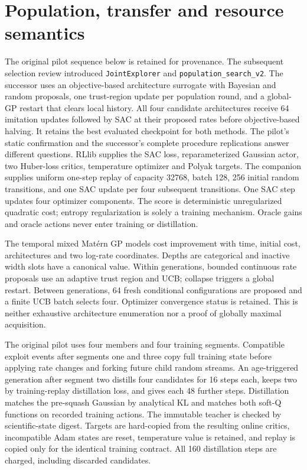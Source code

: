 \section{Population, transfer and resource semantics}
The original pilot sequence below is retained for provenance. The subsequent
selection review introduced \texttt{JointExplorer} and
\texttt{population\_search\_v2}. The successor uses an objective-based
architecture surrogate with Bayesian and random proposals, one trust-region
update per population round, and a global-GP restart that clears local history.
All four candidate architectures receive 64 imitation updates followed by SAC
at their proposed rates before objective-based halving. It retains the best
evaluated checkpoint for both methods. The pilot's static confirmation and the
successor's complete procedure replications answer different questions.
RLlib supplies the SAC loss, reparameterized Gaussian actor, two Huber-loss
critics, temperature optimizer and Polyak targets. The companion supplies
uniform one-step replay of capacity 32768, batch 128, 256 initial random
transitions, and one SAC update per four subsequent transitions. One SAC step
updates four optimizer components. The score is deterministic unregularized
quadratic cost; entropy regularization is solely a training mechanism. Oracle
gains and oracle actions never enter training or distillation.

The temporal mixed Mat\'ern GP models cost improvement with time, initial cost,
architectures and two log-rate coordinates. Depths are categorical and inactive
width slots have a canonical value. Within generations, bounded continuous
rate proposals use an adaptive trust region and UCB; collapse triggers a global
restart. Between generations, 64 fresh conditional configurations are proposed
and a finite UCB batch selects four. Optimizer convergence status is retained.
This is neither exhaustive architecture enumeration nor a proof of globally
maximal acquisition.

The original pilot uses four members and four training segments.
Compatible exploit events after segments one and three copy full training
state before applying rate changes and forking future child random streams.
An age-triggered generation after segment two distills four candidates for
16 steps each, keeps two by training-replay distillation loss, and gives each
48 further steps. Distillation matches the pre-squash Gaussian by analytical
KL and matches both soft-Q functions on recorded training actions. The immutable
teacher is checked by scientific-state digest. Targets are hard-copied from
the resulting online critics, incompatible Adam states are reset, temperature
value is retained, and replay is copied only for the identical training contract.
All 160 distillation steps are charged, including discarded candidates.

